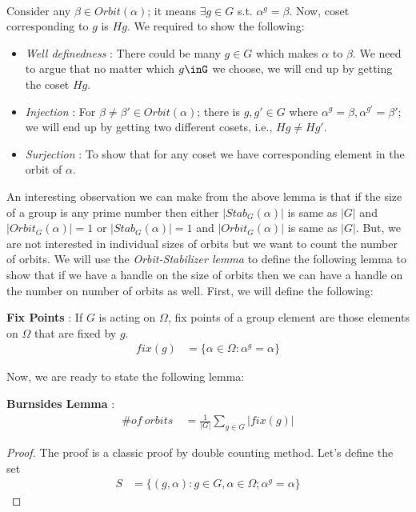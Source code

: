 {\paragraph{}
Consider any $\beta\in Orbit(\alpha)$; it means $\exists g\in G $ s.t. $\alpha^g=\beta $. Now, coset corresponding to $g$ is $Hg$. We required to show the following:
\begin{itemize}
\item \emph{Well definedness} : There could be many $g\in G$ which makes $\alpha$ to $\beta$. We need to argue that no matter which $g\inG$ we choose, we will end up by getting the coset $Hg$.
\item \emph{Injection} : For $\beta\neq \beta'\in Orbit(\alpha)$; there is $g,g'\in G$ where $\alpha^g=\beta,\alpha^{g'}=\beta'$; we will end up by getting two different cosets, i.e., $Hg\neq Hg' $.
\item \emph{Surjection} : To show that for any coset we have corresponding element in the orbit of $\alpha$.
\end{itemize}
An interesting observation we can make from the above lemma is that if the size of a group is any prime number then either $|Stab_G(\alpha)|$ is same as $|G|$ and $|Orbit_G(\alpha)|=1$ or $|Stab_G(\alpha)|=1$ and $|Orbit_G(\alpha)|$ is same as $|G|$. But, we are not interested in individual sizes of orbits but we want to count the number of orbits. We will use the \emph{Orbit-Stabilizer lemma} to define the following lemma to show that if we have a handle on the size of orbits then we can have a handle on the number on number of orbits as well. First, we will define the following:
\begin{definition}
\textbf{Fix Points} : If $G$ is acting on $\Omega$, fix points of a group element are those elements on $\Omega$ that are fixed by $g$.
\begin{align*}
fix(g)&=\{\alpha\in \Omega: \alpha^g=\alpha \}
\end{align*}
\end{definition}
Now, we are ready to state the following lemma:
\begin{lemma}
\textbf{Burnsides Lemma} : 
\begin{align*}
\#of \ orbits \ &=\frac{1}{|G|}\sum_{g\in G}|fix(g)|
\end{align*}
\end{lemma}
\begin{proof}
The proof is a classic proof by double counting method. Let's define the set
\begin{align*}
S&=\{(g,\alpha): g\in G, \alpha\in \Omega; \alpha^g=\alpha \}

\end{align*}
\end{proof}}
